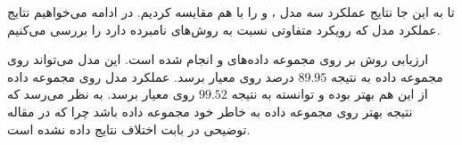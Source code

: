 تا به این جا نتایج عملکرد سه مدل ،  و  را با هم مقایسه کردیم.
در ادامه می‌خواهیم نتایج عملکرد مدل  که رویکرد متفاوتی نسبت به روش‌های نامبرده دارد را
بررسی می‌کنیم.

ارزیابی روش  بر روی مجموعه داده‌های  و  انجام شده است.
این مدل می‌تواند روی مجموعه داده  به نتیجه $89.95$ درصد روی معیار  برسد. عملکرد مدل روی مجموعه داده
 از این هم بهتر بوده و توانسته به نتیجه $99.52$ روی معیار  برسد.
به نظر می‌رسد که نتیجه بهتر روی مجموعه داده  به خاطر خود مجموعه داده باشد چرا که در
مقاله توضیحی در بابت اختلاف نتایج داده نشده است.